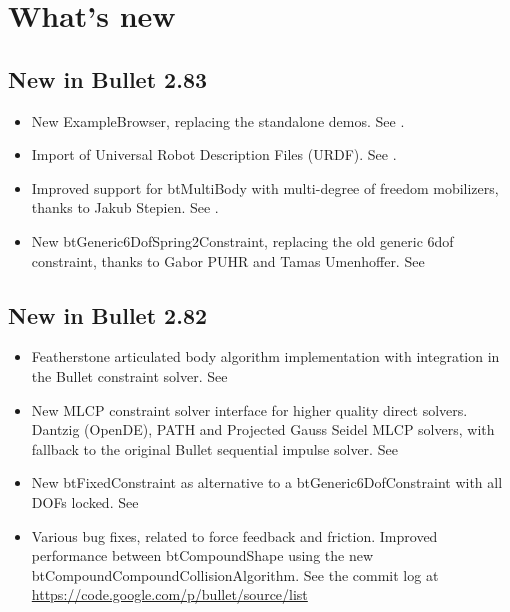 \section{What's new}

\subsection{New in Bullet 2.83}
\begin{itemize}
	\item New ExampleBrowser, replacing the standalone demos. See .
	\item Import of Universal Robot Description Files (URDF). See .
	\item Improved support for btMultiBody with multi-degree of freedom mobilizers, thanks to Jakub Stepien. See .
	\item New btGeneric6DofSpring2Constraint, replacing the old generic 6dof constraint, thanks to Gabor PUHR and Tamas Umenhoffer. See 	
\end{itemize}
\subsection{New in Bullet 2.82}
\begin{itemize}
	\item Featherstone articulated body algorithm implementation with integration in the Bullet constraint solver. See 
	\item New MLCP constraint solver interface for higher quality direct solvers. Dantzig (OpenDE), PATH and Projected Gauss Seidel MLCP solvers, with fallback to the original Bullet sequential impulse solver. See 
	\item New btFixedConstraint as alternative to a btGeneric6DofConstraint with all DOFs locked. See 
	\item Various bug fixes, related to force feedback and friction. Improved performance between btCompoundShape using the new btCompoundCompoundCollisionAlgorithm. See the commit log at \url{https://code.google.com/p/bullet/source/list}
\end{itemize}

